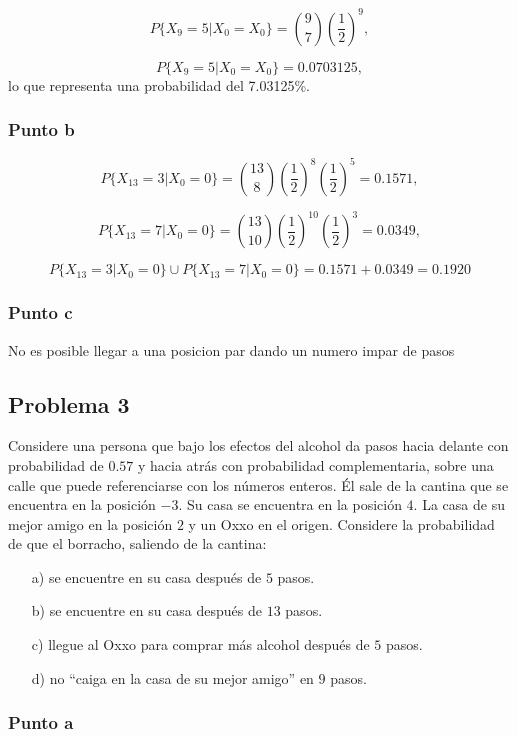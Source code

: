 \documentclass{article}
\begin{document}
\[
    P\{X_9 = 5 | X_0 = X_0\} = \binom{9}{7} \left(\frac{1}{2}\right)^{9},
\]

\[
    P\{X_9 = 5 | X_0 = X_0\} = 0.0703125,
\]
lo que representa una probabilidad del 7.03125\%.

\subsubsection*{Punto b}

\[
    P\{X_{13} = 3 | X_0 = 0\} = \binom{13}{8} \left(\frac{1}{2}\right)^{8} \left(\frac{1}{2}\right)^{5} = 0.1571,
\]

\[
    P\{X_{13} =7 | X_0 = 0\} = \binom{13}{10} \left(\frac{1}{2}\right)^{10} \left(\frac{1}{2}\right)^{3} = 0.0349,
\]

\[
    P\{X_{13} = 3 | X_0 = 0\} \cup  P\{X_{13} =7 | X_0 = 0\} = 0.1571 + 0.0349 = 0.1920
\]

\subsubsection*{Punto c}

No es posible llegar a una posicion par dando un numero impar de pasos

\subsection*{Problema 3}

Considere una persona que bajo los efectos del alcohol da pasos hacia
delante con probabilidad de $0.57$ y hacia atrás con probabilidad
complementaria, sobre una calle que puede referenciarse con los números
enteros. Él sale de la cantina que se encuentra en la posición $-3$. Su casa se
encuentra en la posición $4$. La casa de su mejor amigo en la posición $2$ y un
Oxxo en el origen. Considere la probabilidad de que el borracho, saliendo de
la cantina:

\begin{itemize}
    \item[a)] se encuentre en su casa después de $5$ pasos.
    \item[b)] se encuentre en su casa después de $13$ pasos.
    \item[c)] llegue al Oxxo para comprar más alcohol después de $5$ pasos.
    \item[d)] no ``caiga en la casa de su mejor amigo'' en $9$ pasos.
\end{itemize}

\subsubsection*{Punto a}
\end{document}
